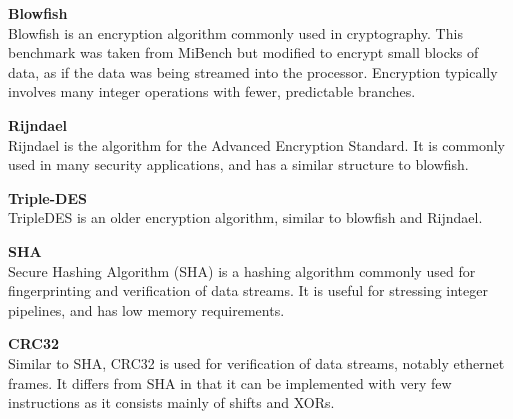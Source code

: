 \documentclass[twocolumn]{article}
\begin{document}
\vspace{3mm}
\textbf{Blowfish}\\
Blowfish is an encryption algorithm commonly used in cryptography. This benchmark was taken from MiBench but modified to encrypt small blocks of data, as if the data was being streamed into the processor. Encryption typically involves many integer operations with fewer, predictable branches.

\vspace{3mm}
\textbf{Rijndael}\\
Rijndael is the algorithm for the Advanced Encryption Standard. It is commonly used in many security applications, and has a similar structure to blowfish.

\vspace{3mm}
\textbf{Triple-DES}\\
TripleDES is an older encryption algorithm, similar to blowfish and Rijndael.

\vspace{3mm}
\textbf{SHA}\\
Secure Hashing Algorithm (SHA) is a hashing algorithm commonly used for fingerprinting and verification of data streams. It is useful for stressing integer pipelines, and has low memory requirements.

\vspace{3mm}
\textbf{CRC32}\\
Similar to SHA, CRC32 is used for verification of data streams, notably ethernet frames. It differs from SHA in that it can be implemented with very few instructions as it consists mainly of shifts and XORs.
\end{document}
